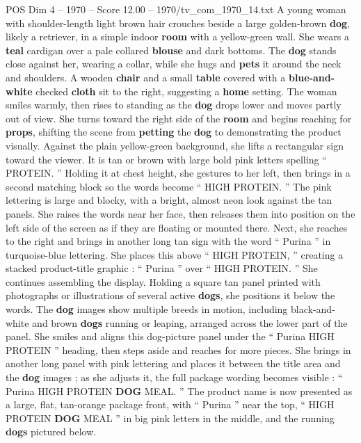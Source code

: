 \begin{textsample}{POS Dim 4 – 1970 – Score 12.00 – 1970/tv\_com\_1970\_14.txt}  \label{ex:f4_pos_088}
A young woman with shoulder-length light brown hair crouches beside a large golden-brown \textbf{dog}, likely a retriever, in a simple indoor \textbf{room} with a yellow-green wall.
She wears a \textbf{teal} cardigan over a pale collared \textbf{blouse} and dark bottoms.
The \textbf{dog} stands close against her, wearing a collar, while she hugs and \textbf{pets} it around the neck and shoulders.
A wooden \textbf{chair} and a small \textbf{table} covered with a \textbf{blue-and-white} checked \textbf{cloth} sit to the right, suggesting a \textbf{home} setting.
The woman smiles warmly, then rises to standing as the \textbf{dog} drops lower and moves partly out of view.
She turns toward the right side of the \textbf{room} and begins reaching for \textbf{props}, shifting the scene from \textbf{petting} the \textbf{dog} to demonstrating the product visually.
Against the plain yellow-green background, she lifts a rectangular sign toward the viewer.
It is tan or brown with large bold pink letters spelling “ PROTEIN. ” Holding it at chest height, she gestures to her left, then brings in a second matching block so the words become “ HIGH PROTEIN. ” The pink lettering is large and blocky, with a bright, almost neon look against the tan panels.
She raises the words near her face, then releases them into position on the left side of the screen as if they are floating or mounted there.
Next, she reaches to the right and brings in another long tan sign with the word “ Purina ” in turquoise-blue lettering.
She places this above “ HIGH PROTEIN, ” creating a stacked product-title graphic : “ Purina ” over “ HIGH PROTEIN. ” She continues assembling the display.
Holding a square tan panel printed with photographs or illustrations of several active \textbf{dogs}, she positions it below the words.
The \textbf{dog} images show multiple breeds in motion, including black-and-white and brown \textbf{dogs} running or leaping, arranged across the lower part of the panel.
She smiles and aligns this dog-picture panel under the “ Purina HIGH PROTEIN ” heading, then steps aside and reaches for more pieces.
She brings in another long panel with pink lettering and places it between the title area and the \textbf{dog} images ; as she adjusts it, the full package wording becomes visible : “ Purina HIGH PROTEIN \textbf{DOG} MEAL. ” The product name is now presented as a large, flat, tan-orange package front, with “ Purina ” near the top, “ HIGH PROTEIN \textbf{DOG} MEAL ” in big pink letters in the middle, and the running \textbf{dogs} pictured below.

\end{textsample}

